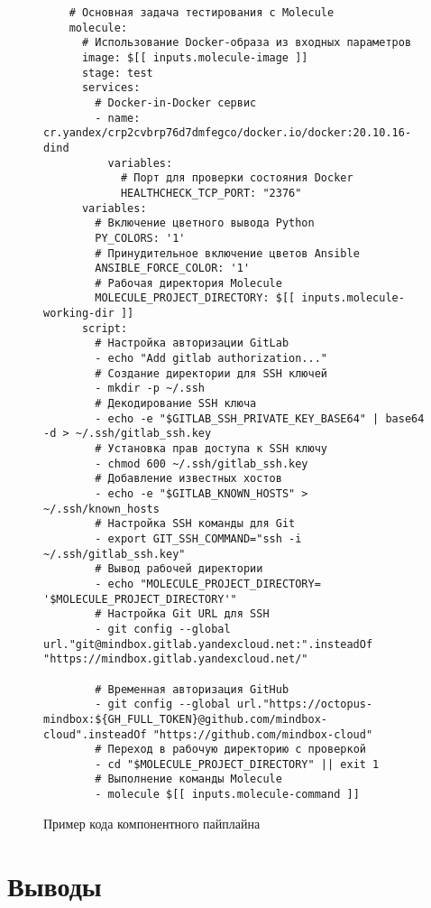 \begin{figure}
\begin{verbatim}
    # Основная задача тестирования с Molecule
    molecule:
      # Использование Docker-образа из входных параметров
      image: $[[ inputs.molecule-image ]]
      stage: test
      services:
        # Docker-in-Docker сервис
        - name: cr.yandex/crp2cvbrp76d7dmfegco/docker.io/docker:20.10.16-dind
          variables:
            # Порт для проверки состояния Docker
            HEALTHCHECK_TCP_PORT: "2376"
      variables:
        # Включение цветного вывода Python
        PY_COLORS: '1'
        # Принудительное включение цветов Ansible
        ANSIBLE_FORCE_COLOR: '1'
        # Рабочая директория Molecule
        MOLECULE_PROJECT_DIRECTORY: $[[ inputs.molecule-working-dir ]]
      script:
        # Настройка авторизации GitLab
        - echo "Add gitlab authorization..."
        # Создание директории для SSH ключей
        - mkdir -p ~/.ssh
        # Декодирование SSH ключа
        - echo -e "$GITLAB_SSH_PRIVATE_KEY_BASE64" | base64 -d > ~/.ssh/gitlab_ssh.key
        # Установка прав доступа к SSH ключу
        - chmod 600 ~/.ssh/gitlab_ssh.key
        # Добавление известных хостов
        - echo -e "$GITLAB_KNOWN_HOSTS" > ~/.ssh/known_hosts
        # Настройка SSH команды для Git
        - export GIT_SSH_COMMAND="ssh -i ~/.ssh/gitlab_ssh.key"
        # Вывод рабочей директории
        - echo "MOLECULE_PROJECT_DIRECTORY= '$MOLECULE_PROJECT_DIRECTORY'"
        # Настройка Git URL для SSH
        - git config --global url."git@mindbox.gitlab.yandexcloud.net:".insteadOf "https://mindbox.gitlab.yandexcloud.net/"

        # Временная авторизация GitHub
        - git config --global url."https://octopus-mindbox:${GH_FULL_TOKEN}@github.com/mindbox-cloud".insteadOf "https://github.com/mindbox-cloud"
        # Переход в рабочую директорию с проверкой
        - cd "$MOLECULE_PROJECT_DIRECTORY" || exit 1
        # Выполнение команды Molecule
        - molecule $[[ inputs.molecule-command ]]
  \end{verbatim}
  \caption{Пример кода компонентного пайплайна}
  \label{fig:component-pipeline}
\end{figure}


\section{Выводы} \label{sec:conclusion}
